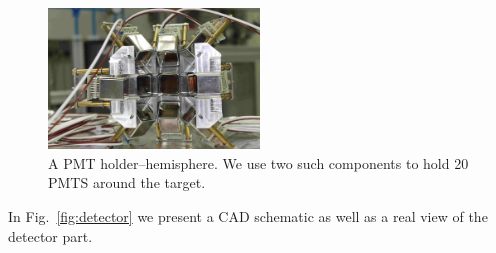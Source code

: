 \begin{figure}
   \centering
   \includegraphics[width=0.5\textwidth]{PMTholder.JPG}
   \caption{A PMT holder--hemisphere. We use two such components to hold 20 PMTS around the target.} 
   \label{fig:pmtholder}
\end{figure}


In Fig.~\ref{fig:detector} we present a CAD schematic as well as a real view of the detector part.

